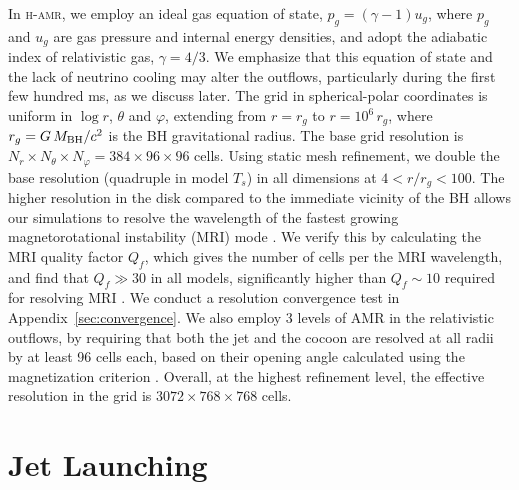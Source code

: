 \documentclass[twocolumn,dvipsnames]{aastex62}
\newcommand{\mbh}{\,{M_{\rm BH}}}
\begin{document}
In \textsc{h-amr}, we employ an ideal gas equation of state, $p_g = (\gamma - 1) u_g$, where $p_g$ and $u_g$ are gas pressure and internal energy densities, and adopt the adiabatic index of relativistic gas, $\gamma = 4/3$. We emphasize that this equation of state and the lack of neutrino cooling may alter the outflows, particularly during the first few hundred ms, as we discuss later. The grid in spherical-polar coordinates is uniform in $\log r$, $\theta$ and $\varphi$, extending from $ r = r_g $ to $ r = 10^6\,r_g$, where $r_g=G\mbh/c^2$ is the BH gravitational radius. The base grid resolution is $N_r\times N_\theta\times N_\varphi = 384\times 96\times 96$ cells. Using static mesh refinement, we double the base resolution (quadruple in model $ T_s $) in all dimensions at $4 < r/r_g < 100 $. The higher resolution in the disk compared to the immediate vicinity of the BH allows our simulations to resolve the wavelength of the fastest growing magnetorotational instability (MRI) mode \citep{Balbus1991}. We verify this by calculating the MRI quality factor $ Q_f $, which gives the number of cells per the MRI wavelength, and find that $ Q_f \gg 30 $ in all models, significantly higher than $ Q_f \sim 10 $ required for resolving MRI \citep{Hawley2011}. We conduct a resolution convergence test in Appendix~\ref{sec:convergence}. We also employ 3 levels of AMR in the relativistic outflows, by requiring that both the jet and the cocoon are resolved at all radii by at least 96 cells each, based on their opening angle calculated using the magnetization criterion \citep[see details in][]{Gottlieb2022b}. Overall, at the highest refinement level, the effective resolution in the grid is $3072\times 768\times 768$ cells.
 
\section{Jet Launching}\label{sec:launching}
\end{document}
